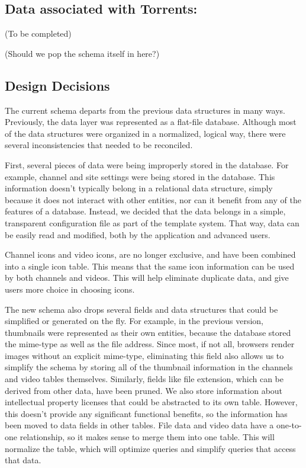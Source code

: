 \documentclass[a4paper,12pt]{report}
\begin{document}
\subsection{Data associated with Torrents:}
(To be completed)

(Should we pop the schema itself in here?)


\subsection{Design Decisions}
The current schema departs from the previous data structures in many ways.
Previously, the data layer was represented as a flat-file database.
Although most of the data structures were organized in a normalized, logical way, there were several inconsistencies that needed to be reconciled.


First, several pieces of data were being improperly stored in the database. 
For example, channel and site settings were being stored in the database. 
This information doesn't typically belong in a relational data structure, simply because it does not interact with other entities, nor can it benefit from any of the features of a database. 
Instead, we decided that the data belongs in a simple, transparent configuration file as part of the template system. 
That way, data can be easily read and modified, both by the application and advanced users. 


Channel icons and video icons, are no longer exclusive, and have been combined into a single icon table.
This means that the same icon information can be used by both channels and videos. This will help eliminate duplicate data, and give users more choice in choosing icons.


The new schema also drops several fields and data structures that could be simplified or generated on the fly.
For example, in the previous version, thumbnails were represented as their own entities, because the database stored the mime-type as well as the file address.
Since most, if not all, browsers render images without an explicit mime-type, eliminating this field also allows us to simplify the schema by storing all of the thumbnail information in the channels and video tables themselves.
Similarly, fields like file extension, which can be derived from other data, have been pruned.
We also store information about intellectual property licenses that could be abstracted to its own table.
However, this doesn't provide any significant functional benefits, so the information has been moved to data fields in other tables. 
File data and video data have a one-to-one relationship, so it makes sense to merge them into one table.
This will normalize the table, which will optimize queries and simplify queries that access that data.
\end{document}
